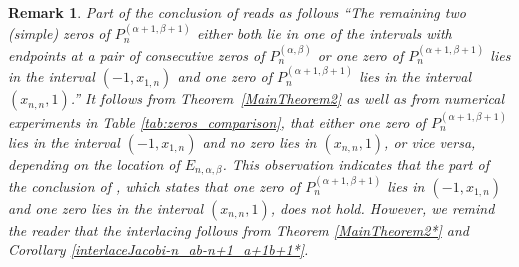 \documentclass[final,3p,times,12pt]{elsarticle}
\newtheorem{remark}{Remark}[section]
\numberwithin{equation}{section}  %
\begin{document}
\begin{remark}\label{rmk2:interlaceJacobi-n_ab-n+1_a+1b+1}
	Part of the conclusion of \cite[Theorem~3]{Arvesu-Driver-Littlejohn-RamanujanJ-2023} reads as follows 
	``The remaining two (simple) zeros of $P_{n}^{(\alpha+1,\beta+1)}$ either both lie in one of the intervals with endpoints at a pair of consecutive zeros of $P_{n}^{(\alpha,\beta)}$ or one zero of $P_{n}^{(\alpha+1,\beta+1)}$ lies in the interval $(-1,x_{1,n})$ and one zero of $P_{n}^{(\alpha+1,\beta+1)}$ lies in the interval $(x_{n,n}, 1)$.''  
	It follows from Theorem~\ref{MainTheorem2}  as well as from numerical experiments in Table \ref{tab:zeros_comparison}, that either one zero of $P_{n}^{(\alpha+1,\beta+1)}$ lies in the interval $(-1,x_{1,n})$ and no zero lies in $(x_{n,n}, 1)$, or vice versa, depending on the location of $E_{n,\alpha,\beta}$.  
	This observation indicates that the part of the conclusion of \cite[Theorem~3]{Arvesu-Driver-Littlejohn-RamanujanJ-2023}, which states that one zero of $P_{n}^{(\alpha+1,\beta+1)}$ lies in $(-1,x_{1,n})$ and one zero lies in the interval $(x_{n,n}, 1)$, does not hold. However, we remind the reader that the interlacing follows from Theorem \ref{MainTheorem2*} and Corollary \ref{interlaceJacobi-n_ab-n+1_a+1b+1*}.
\end{remark}
\end{document}
